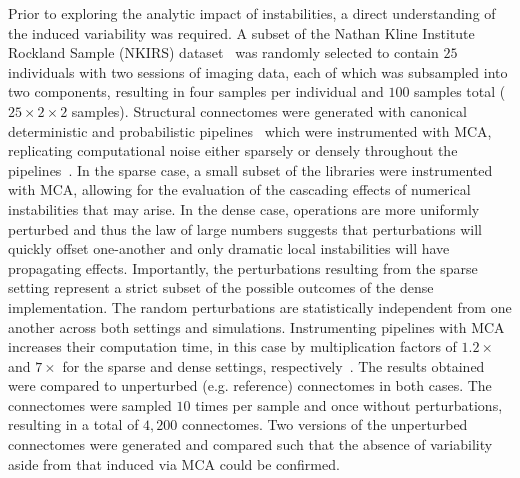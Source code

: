 \documentclass[fleqn,10pt]{SelfArx} %
\newcommand{\new}[1]{{\color{blue} #1}}
\begin{document}
Prior to exploring the analytic impact of instabilities, a direct understanding of the induced variability was
required. A subset of the Nathan Kline Institute Rockland Sample (NKIRS) dataset~\cite{Nooner2012-eg} was randomly
selected to contain $25$ individuals with two sessions of imaging data, each of which was subsampled into two
components, resulting in four \new{samples} per individual \new{and $100$ samples total ($25 \times 2 \times 2$ samples)}. Structural connectomes were generated with canonical
deterministic and probabilistic pipelines~\cite{Garyfallidis2014-ql,Garyfallidis2012-gg} which were instrumented with
MCA, replicating computational noise either \new{sparsely} or \new{densely} throughout the pipelines~\cite{Denis2016-wo,Kiar2020-lb}.
\new{In the sparse case, a small subset of the libraries were instrumented with MCA, allowing for the evaluation of the
cascading effects of numerical instabilities that may arise. In the dense case, operations are more uniformly perturbed
and thus the law of large numbers suggests that perturbations will quickly offset one-another and only dramatic local
instabilities will have propagating effects. Importantly, the perturbations resulting from the sparse setting
represent a strict subset of the possible outcomes of the dense implementation. The random perturbations are statistically independent from one another
across both settings and simulations. Instrumenting pipelines with MCA increases their computation time, in this
case by multiplication factors of $1.2 \times$ and $7 \times$ for the sparse and dense settings, respectively~\cite{Kiar2020-lb}.
The results obtained were compared to unperturbed (e.g. reference) connectomes in both cases.}
The \new{connectomes} were sampled \new{$10$} times per \new{sample} and once without perturbations, resulting in a total of
$4,200$ connectomes. \new{Two versions of the unperturbed connectomes were generated and compared such that the absence
of variability aside from that induced via MCA could be confirmed}.
\end{document}
